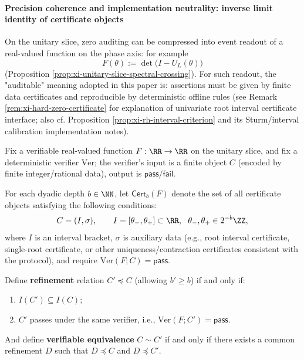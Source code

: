 \paragraph{Precision coherence and implementation neutrality: inverse limit identity of certificate objects}
On the unitary slice, zero auditing can be compressed into event readout of a real-valued function on the phase axis: for example
\[
F(\theta):=\det\!\bigl(I-U_L(\theta)\bigr)
\]
(Proposition \ref{prop:xi-unitary-slice-spectral-crossing}).
For such readout, the "auditable" meaning adopted in this paper is: assertions must be given by finite data certificates and reproducible by deterministic offline rules (see Remark \ref{rem:xi-hard-zero-certificate} for explanation of univariate root interval certificate interface; also cf. Proposition \ref{prop:xi-rh-interval-criterion} and its Sturm/interval calibration implementation notes).

\begin{definition}\label{def:xi-cert-refinement-equivalence}
Fix a verifiable real-valued function \(F:\RR\to\RR\) on the unitary slice, and fix a deterministic verifier \(\mathrm{Ver}\);
the verifier's input is a finite object \(C\) (encoded by finite integer/rational data), output is \(\mathsf{pass}/\mathsf{fail}\).
\par
For each dyadic depth \(b\in\NN\), let \(\mathsf{Cert}_b(F)\) denote the set of all certificate objects satisfying the following conditions:
\[
C=(I,\sigma),\qquad I=[\theta_{-},\theta_{+}]\subset\RR,\ \ \theta_{-},\theta_{+}\in 2^{-b}\ZZ,
\]
where \(I\) is an interval bracket, \(\sigma\) is auxiliary data (e.g., root interval certificate, single-root certificate, or other uniqueness/contraction certificates consistent with the protocol), and require
\(
\mathrm{Ver}(F;C)=\mathsf{pass}
\).
\par
Define \textbf{refinement} relation \(C'\preceq C\) (allowing \(b'\ge b\)) if and only if:
\begin{enumerate}
  \item \(I(C')\subseteq I(C)\);
  \item \(C'\) passes under the same verifier, i.e., \(\mathrm{Ver}(F;C')=\mathsf{pass}\).
\end{enumerate}
And define \textbf{verifiable equivalence} \(C\sim C'\) if and only if there exists a common refinement \(D\) such that \(D\preceq C\) and \(D\preceq C'\).
\end{definition}

